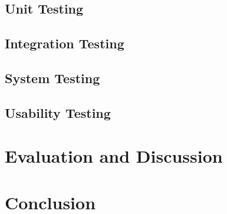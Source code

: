 \documentclass[11pt]{article}
\begin{document}
\subsection{Unit Testing} \label{unit-testing}

\subsection{Integration Testing} \label{integration-testing}

\subsection{System Testing} \label{system-testing}

\subsection{Usability Testing} \label{usability-testing}


\section{Evaluation and Discussion} \label{evaluation-discussion}

\section{Conclusion} \label{conclusion}


%
 
\end{document}
